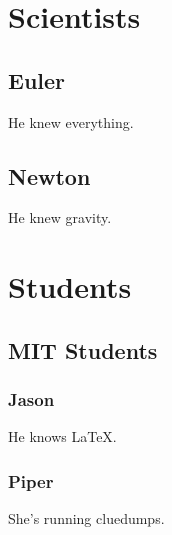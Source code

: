 \documentclass[letter,11pt]{article}
\title{}
\author{Jason Gross}
\begin{document}
\section{Scientists}
  \subsection{Euler}
    He knew everything.
  \subsection{Newton}
    He knew gravity.
\section{Students}
  \subsection{MIT Students}
    \subsubsection*{Jason}
      He knows \LaTeX.
    \subsubsection*{Piper}
      She's running cluedumps.
\end{document}
